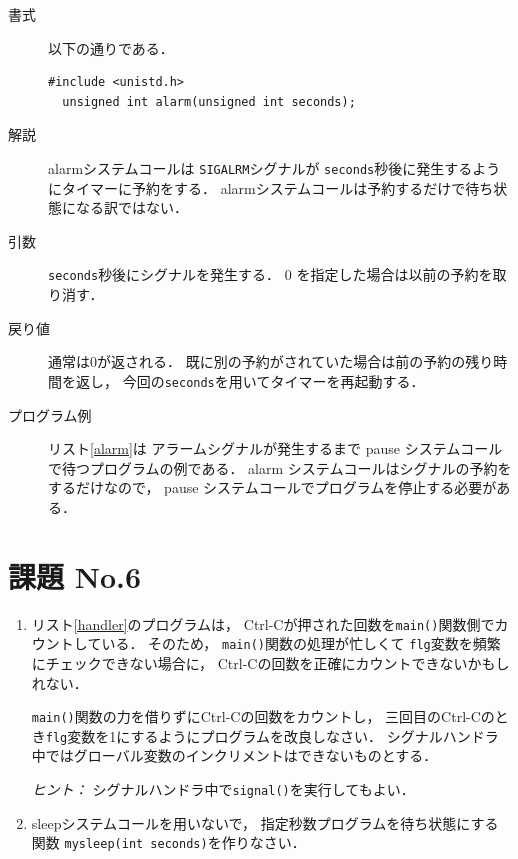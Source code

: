 \begin{description}
\item[書式] 以下の通りである．

\begin{lstlisting}[numbers=none]
  #include <unistd.h>
  unsigned int alarm(unsigned int seconds);
\end{lstlisting}

\item[解説]
  alarmシステムコールは
  \texttt{SIGALRM}シグナルが
  \texttt{seconds}秒後に発生するようにタイマーに予約をする．
  alarmシステムコールは予約するだけで待ち状態になる訳ではない．

\item[引数]
  \texttt{seconds}秒後にシグナルを発生する．
  0 を指定した場合は以前の予約を取り消す．

\item[戻り値]
  通常は0が返される．
  既に別の予約がされていた場合は前の予約の残り時間を返し，
  今回の\texttt{seconds}を用いてタイマーを再起動する．

\item[プログラム例]
  リスト\ref{alarm}は
  アラームシグナルが発生するまで
  pause システムコールで待つプログラムの例である．
  alarm システムコールはシグナルの予約をするだけなので，
  pause システムコールでプログラムを停止する必要がある．

  

\end{description}

\section*{課題 No.6}
\begin{enumerate}
\item リスト\ref{handler}のプログラムは，
  Ctrl-Cが押された回数を\texttt{main()}関数側でカウントしている．
  そのため，
  \texttt{main()}関数の処理が忙しくて
  \texttt{flg}変数を頻繁にチェックできない場合に，
  Ctrl-Cの回数を正確にカウントできないかもしれない．
  
  \texttt{main()}関数の力を借りずにCtrl-Cの回数をカウントし，
  三回目のCtrl-Cのとき\texttt{flg}変数を1にするようにプログラムを改良しなさい．
  シグナルハンドラ中ではグローバル変数のインクリメントはできないものとする．

  \emph{ヒント：} シグナルハンドラ中で\texttt{signal()}を実行してもよい．

\item sleepシステムコールを用いないで，
  指定秒数プログラムを待ち状態にする関数
  \texttt{mysleep(int seconds)}を作りなさい．

\end{enumerate}
